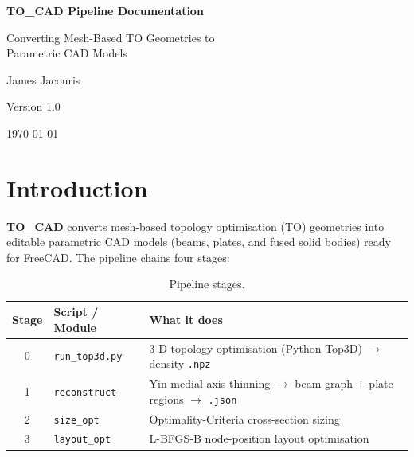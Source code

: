\documentclass[a4paper, 11pt, openany]{report}
\begin{document}
\begin{titlepage}
\centering
\vspace*{4cm}
{\Huge\bfseries TO\_CAD Pipeline Documentation\par}
\vspace{1cm}
{\Large Converting Mesh-Based TO Geometries to\\Parametric CAD Models\par}
\vspace{2cm}
{\large James Jacouris\par}
\vspace{1cm}
{\large Version 1.0\par}
\vspace{0.5cm}
{\large \today\par}
\vfill
\end{titlepage}

\tableofcontents
\listoffigures
\listoftables

\chapter{Introduction}
\label{ch:introduction}

\textbf{TO\_CAD} converts mesh-based topology optimisation (TO) geometries into
editable parametric CAD models (beams, plates, and fused solid bodies) ready
for FreeCAD.  The pipeline chains four stages:

\begin{table}[htbp]
\caption{Pipeline stages.}
\label{tab:pipeline-stages}
\centering
\begin{tabularx}{\textwidth}{clX}
\toprule
Stage & Script / Module & What it does \\
\midrule
0 & \texttt{run\_top3d.py} & 3-D topology optimisation (Python Top3D) $\to$ density \texttt{.npz} \\
1 & \texttt{reconstruct} & Yin medial-axis thinning $\to$ beam graph + plate regions $\to$ \texttt{.json} \\
2 & \texttt{size\_opt} & Optimality-Criteria cross-section sizing \\
3 & \texttt{layout\_opt} & L-BFGS-B node-position layout optimisation \\
\bottomrule
\end{tabularx}
\end{table}
\end{document}
